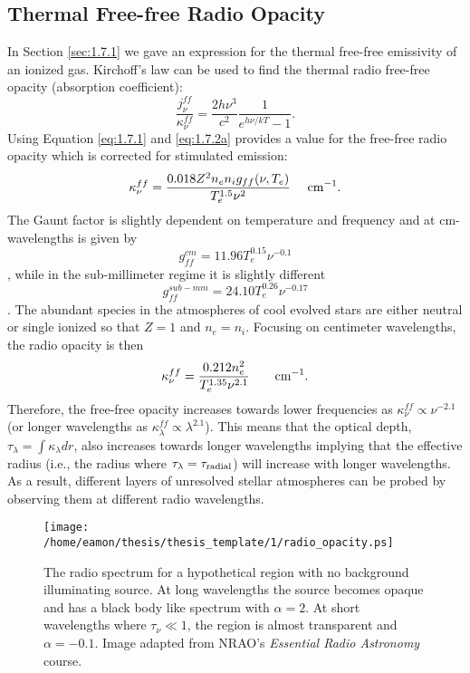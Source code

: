 \subsection{Thermal Free-free Radio Opacity}\label{sec:1.8.3}
In Section \ref{sec:1.7.1} we gave an expression for the thermal free-free emissivity of an ionized gas. Kirchoff's law can be used to find the thermal radio free-free opacity (absorption coefficient):
\begin{equation}
\frac{j_{\nu}^{ff}}{\kappa _{\nu}^{ff}}=\frac{2h\nu ^3}{c^2}\frac{1}{e^{h\nu /kT}-1}.
\end{equation}
Using Equation \ref{eq:1.7.1} and \ref{eq:1.7.2a} provides a value for the free-free radio opacity which is corrected for stimulated emission:
\begin{equation}
\kappa _{\nu}^{ff} = \frac{0.018Z^2n_{e}n_{i}g_{ff}(\nu ,T_{e})}{T_{e}^{1.5}\nu ^{2}}\ \ \ \ \rm{cm^{-1}}.
\end{equation}
The Gaunt factor is slightly dependent on temperature and frequency and at cm-wavelengths is given by
\begin{equation}
g_{ff}^{cm}=11.96T_{e}^{0.15}\nu ^{-0.1}
\end{equation}
\citep{Altenhoff_1960}, while in the  sub-millimeter regime it is slightly different
\begin{equation}
g_{ff}^{sub-mm}=24.10T_{e}^{0.26}\nu ^{-0.17}
\end{equation}
\citep{harper_2013,hummer_1988}. The abundant species in the atmospheres of cool evolved stars are either neutral or single ionized so that $Z=1$ and $n_{e} = n_{i}$. Focusing on centimeter wavelengths, the radio opacity is then
\begin{equation}\label{eq:1.22}
\kappa _{\nu}^{ff} = \frac{0.212n_{e}^2}{T_{e}^{1.35}\nu ^{2.1}}\ \ \ \ \ \ \rm{cm}^{-1}.
\end{equation}
Therefore, the free-free opacity increases towards lower frequencies as $\kappa _{\nu}^{ff} \propto \nu ^{-2.1}$ (or longer wavelengths as $\kappa _{\lambda}^{ff} \propto \lambda ^{2.1}$). This means that the optical depth, $\tau _{\lambda}= \int \kappa _{\lambda} dr$, also increases towards longer wavelengths implying that the effective radius (i.e., the radius where $\tau _{\lambda} = \tau _{\rm{radial}}$) will increase with longer wavelengths. As a result, different layers of unresolved stellar atmospheres can be probed by observing them at different radio wavelengths.

\begin{figure}[t!]
\centering 
          \texttt{[image: /home/eamon/thesis/thesis\_template/1/radio\_opacity.ps]}
\caption[ region radio spectrum]{The radio spectrum for a hypothetical  region with no background illuminating source. At long wavelengths the source becomes opaque and has a black body like spectrum with $\alpha = 2$. At short wavelengths where $\tau _{\nu} \ll 1$, the  region is almost transparent and $\alpha = -0.1$. Image adapted from NRAO's \textit{Essential Radio Astronomy} course.}
\label{fig:1.5.3}
\end{figure}


